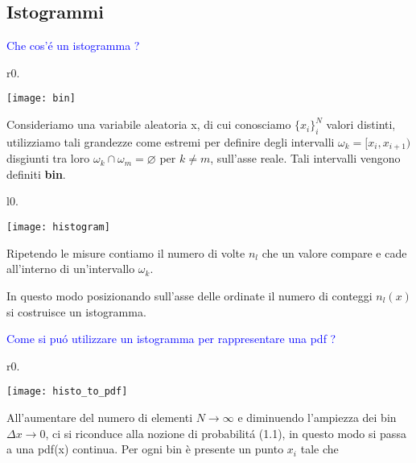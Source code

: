 \subsection{Istogrammi}

\textcolor{blue}{Che cos'\'{e} un istogramma ?}\newline


\begin{wrapfigure}{r}{0.\textwidth}
\centering

\texttt{[image: bin]}	

\end{wrapfigure}

Consideriamo una variabile aleatoria x, di cui conosciamo $\{x_i\}_i^N$ valori distinti, utilizziamo tali grandezze come estremi per definire degli intervalli $\omega_{k} = [x_i, x_{i+1}) $ disgiunti tra loro $\omega_{k} \cap \omega_{m} = \varnothing$ per $k \neq m$, sull'asse reale. Tali intervalli vengono definiti \textbf{bin}.

\begin{wrapfigure}[6]{l}{0.\textwidth}

\centering

\texttt{[image: histogram]}	

\end{wrapfigure}

Ripetendo le misure contiamo il numero di volte $n_l$ che un valore compare e cade all'interno di un'intervallo $\omega_k$. 

In questo modo posizionando sull'asse delle ordinate il numero di conteggi $n_l(x)$ si costruisce un istogramma. \newline

\textcolor{blue}{Come si pu\'{o} utilizzare un istogramma per rappresentare una pdf ?}\newline


\begin{wrapfigure}{r}{0.\textwidth}

\centering

\texttt{[image: histo\_to\_pdf]}	

\end{wrapfigure}

All'aumentare del numero di elementi $N \rightarrow \infty$ e diminuendo l'ampiezza dei bin $\Delta x \rightarrow 0 $, ci si riconduce alla nozione di probabilit\'{a} (1.1), in questo modo si passa a una pdf(x) continua.
Per ogni bin \`{e} presente un punto $x_i$ tale che 

